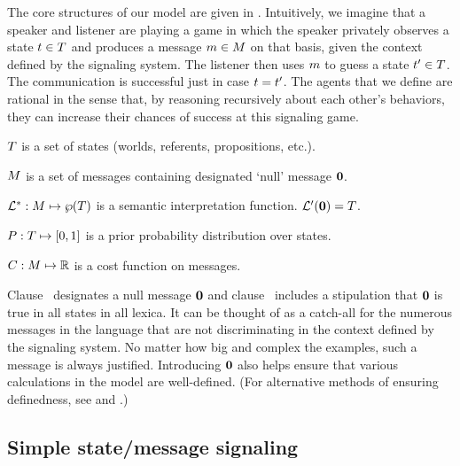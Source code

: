 \documentclass{article}
\begin{document}
The core structures of our model are given in .
Intuitively, we imagine that a speaker and listener are playing a game
in which the speaker privately observes a state $t \in T$
and produces a message $m \in M$ on that basis, given the
context defined by the signaling system. The listener then uses $m$
to guess a state $t' \in T$. The communication is
successful just in case $t = t'$. The agents that we define
are rational in the sense that, by reasoning recursively about each
other's behaviors, they can increase their chances of success at this
signaling game.
%
\begin{examples}
\item\label{model}
  \begin{examples}
  \item\label{states}%
    $T$ is a set of states (worlds, referents, propositions, etc.).
  \item\label{messages}%
    $M$ is a set of messages containing designated `null' message $\mathbf{0}$.
  \item\label{lex}%
    $\mathcal{L}^{\ast}: M \mapsto \wp(T)$ is a semantic interpretation function. 
    $\mathcal{L}'(\mathbf{0}) = T$.
  \item\label{prior}%
    $P : T \mapsto [0,1]$ is a prior probability
    distribution over states.    
  \item\label{costs}%
    $C : M \mapsto \mathbb{R}$ is a cost function on messages.
  \end{examples}
\end{examples}

Clause~ designates a null message $\mathbf{0}$
and clause~ includes a stipulation that $\mathbf{0}$
is true in all states in all lexica. It can be thought of as a
catch-all for the numerous messages in the language that are not
discriminating in the context defined by the signaling system.  No
matter how big and complex the examples, such a message is always
justified. Introducing $\mathbf{0}$ also helps ensure that various
calculations in the model are well-defined. (For alternative methods
of ensuring definedness, see \citealt{Jaeger:2011} and
\citealt{bergen-levy-goodman:2014}.)


\subsection{Simple state/message signaling}\label{sec:rsa}
\end{document}

